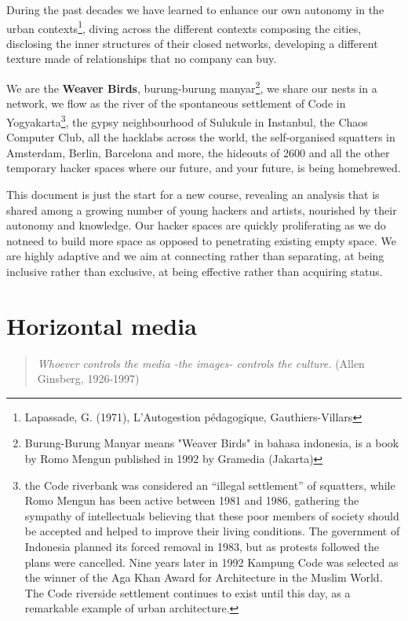 During the past decades we have learned to enhance our own autonomy in the urban
contexts\footnote{Lapassade, G. (1971), L'Autogestion pédagogique,
Gauthiers-Villars}, diving across the dif\hbox{}ferent contexts composing the
cities, disclosing the inner structures of their closed networks, developing a
dif\hbox{}ferent texture made of relationships that no company can buy.

We are the \textbf{Weaver Birds}, burung-burung manyar\footnote{Burung-Burung
Manyar means "Weaver Birds" in bahasa indonesia, is a book by Romo Mengun
published in 1992 by Gramedia (Jakarta)}, we share our nests in a network, we
f\hbox{}low as the river of the spontaneous settlement of Code in
Yogyakarta\footnote{the Code riverbank was considered an ``illegal settlement''
of squatters, while Romo Mengun has been active between 1981 and 1986, gathering
the sympathy of intellectuals believing that these poor members of society
should be accepted and helped to improve their living conditions. The government
of Indonesia planned its forced removal in 1983, but as protests followed the
plans were cancelled. Nine years later in 1992 Kampung Code was selected as the
winner of the Aga Khan Award for Architecture in the Muslim World. The Code
riverside settlement continues to exist until this day, as a remarkable example
of urban architecture.}, the gypsy neighbourhood of Sulukule in Instanbul, the
Chaos Computer Club, all the hacklabs across the world, the self-organised
squatters in Amsterdam, Berlin, Barcelona and more, the hideouts of 2600 and all
the other temporary hacker spaces where our future, and your future, is being
homebrewed.

This document is just the start for a new course, revealing an analysis that is
shared among a growing number of young hackers and artists, nourished by their
autonomy and knowledge. Our hacker spaces are quickly proliferating as we do
notneed to build more space as opposed to penetrating existing empty space. We
are highly adaptive and we aim at connecting rather than separating, at being
inclusive rather than exclusive, at being ef\hbox{}fective rather than acquiring
status.


\section{Horizontal media}
\label{s:weaver_birds:horizontal_media}

\begin{quote}
\textit{Whoever controls the media -the images- controls the culture.} (Allen
Ginsberg, 1926-1997)
\end{quote}

